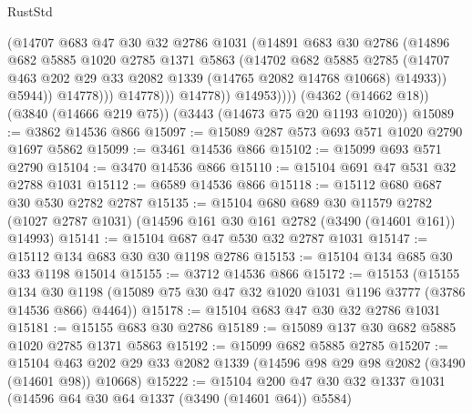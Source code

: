 \begin{lexlean}{RustStd}
\begin{coremodule}
{\begin{coremodule}
{{{{{{{{{{{{{{{{{{{{{{{{{{                          (@14707
                            @683
                            @47
                            @30
                            @32
                            @2786
                            @1031
                            (@14891
                              @683
                              @30
                              @2786
                              (@14896
                                @682
                                @5885
                                @1020
                                @2785
                                @1371
                                @5863
                                (@14702
                                  @682
                                  @5885
                                  @2785
                                  (@14707
                                    @463
                                    @202
                                    @29
                                    @33
                                    @2082
                                    @1339
                                    (@14765 @2082 @14768 @10668)
                                    @14933))
                                @5944))
                            @14778)))
                      @14778)))
                @14778))
            @14953))))
    (@4362 (@14662 @18))
    (@3840 (@14666 @219 @75))
    (@3443 (@14673 @75 @20 @1193 @1020))
@15089 := @3862 @14536 @866
@15097 := @15089 @287 @573 @693 @571 @1020 @2790 @1697 @5862
@15099 := @3461 @14536 @866
@15102 := @15099 @693 @571 @2790
@15104 := @3470 @14536 @866
@15110 := @15104 @691 @47 @531 @32 @2788 @1031
@15112 := @6589 @14536 @866
@15118 := @15112 @680 @687 @30 @530 @2782 @2787
@15135 := @15104
    @680
    @689
    @30
    @11579
    @2782
    (@1027 @2787 @1031)
    (@14596 @161 @30 @161 @2782 (@3490 (@14601 @161)) @14993)
@15141 := @15104 @687 @47 @530 @32 @2787 @1031
@15147 := @15112 @134 @683 @30 @30 @1198 @2786
@15153 := @15104 @134 @685 @30 @33 @1198 @15014
@15155 := @3712 @14536 @866
@15172 := @15153
    (@15155
      @134
      @30
      @1198
      (@15089 @75 @30 @47 @32 @1020 @1031 @1196 @3777 (@3786 @14536 @866) @4464))
@15178 := @15104 @683 @47 @30 @32 @2786 @1031
@15181 := @15155 @683 @30 @2786
@15189 := @15089 @137 @30 @682 @5885 @1020 @2785 @1371 @5863
@15192 := @15099 @682 @5885 @2785
@15207 := @15104
    @463
    @202
    @29
    @33
    @2082
    @1339
    (@14596 @98 @29 @98 @2082 (@3490 (@14601 @98)) @10668)
@15222 := @15104 @200 @47 @30 @32 @1337 @1031 (@14596 @64 @30 @64 @1337 (@3490 (@14601 @64)) @5584)
}}}}}}}}}}}}}}}}}}}}}}}}}}
\end{coremodule}}
\end{coremodule}
\end{lexlean}
